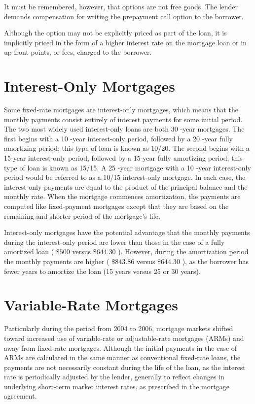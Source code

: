 \documentclass[11pt]{article}
\begin{document}
It must be remembered, however, that options are not free goods. The lender demands compensation for writing the prepayment call option to the borrower.

Although the option may not be explicitly priced as part of the loan, it is implicitly priced in the form of a higher interest rate on the mortgage loan or in up-front points, or fees, charged to the borrower.

\section*{Interest-Only Mortgages}
Some fixed-rate mortgages are interest-only mortgages, which means that the monthly payments consist entirely of interest payments for some initial period. The two most widely used interest-only loans are both 30 -year mortgages. The first begins with a 10 -year interest-only period, followed by a 20 -year fully amortizing period; this type of loan is known as 10/20. The second begins with a 15-year interest-only period, followed by a 15-year fully amortizing period; this type of loan is known as 15/15. A 25 -year mortgage with a 10 -year interest-only period would be referred to as a 10/15 interest-only mortgage. In each case, the interest-only payments are equal to the product of the principal balance and the monthly rate. When the mortgage commences amortization, the payments are computed like fixed-payment mortgages except that they are based on the remaining and shorter period of the mortgage's life.

Interest-only mortgages have the potential advantage that the monthly payments during the interest-only period are lower than those in the case of a fully amortized loan ( $\$ 500$ versus $\$ 644.30$ ). However, during the amortization period the monthly payments are higher ( $\$ 843.86$ versus $\$ 644.30$ ), as the borrower has fewer years to amortize the loan (15 years versus 25 or 30 years).

\section*{Variable-Rate Mortgages}
Particularly during the period from 2004 to 2006, mortgage markets shifted toward increased use of variable-rate or adjustable-rate mortgages (ARMs) and away from fixed-rate mortgages. Although the initial payments in the case of ARMs are calculated in the same manner as conventional fixed-rate loans, the payments are not necessarily constant during the life of the loan, as the interest rate is periodically adjusted by the lender, generally to reflect changes in underlying short-term market interest rates, as prescribed in the mortgage agreement.
\end{document}
